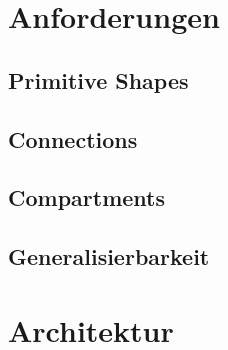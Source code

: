 \section{Anforderungen}

\subsection{Primitive Shapes}

\subsection{Connections}

\subsection{Compartments}

\subsection{Generalisierbarkeit}


\section{Architektur}
